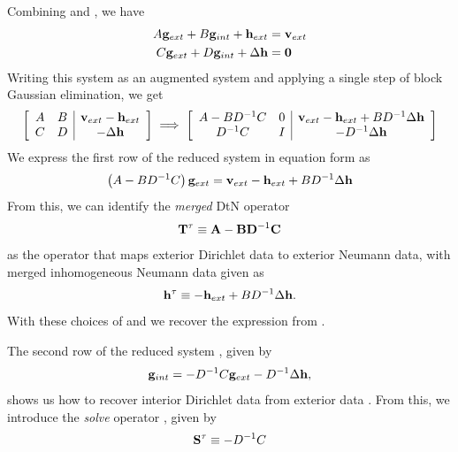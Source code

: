 Combining  and , we have
\begin{equation}
\begin{aligned}
A\mathbf g_{ext} + B\mathbf g_{int} + \mathbf h_{ext} & = \mathbf v_{ext} \\
C\mathbf g_{ext} + D\mathbf g_{int} + \Delta \mathbf h & = \mathbf 0
\end{aligned}
\end{equation}
Writing this system as an augmented system and applying a single step of block Gaussian elimination, we get
\begin{equation}
\left[
\begin{array}{cc|c}
A & B & \mathbf v_{ext} - \mathbf h_{ext}\\
C & D & -\Delta \mathbf h\\
\end{array}\right]
\;
\Longrightarrow 
\;
\left[
\begin{array}{cc|c}
A - BD^{-1}C & 0 & \mathbf v_{ext} - \mathbf h_{ext} + B D^{-1}\Delta \mathbf h\\
D^{-1}C      & I & -D^{-1}\Delta \mathbf h
\end{array}\right]
\label{eq:reduced_system}
\end{equation}
We express the first row of the reduced system in equation form as 
\begin{equation}
\left(A - BD^{-1}C\right) \mathbf g_{ext} = \mathbf v_{ext} - \mathbf h_{ext} + B D^{-1}\Delta \mathbf h
\label{eq:complete_ops}
\end{equation}
From this, we can identify the {\em merged} DtN operator 
\begin{equation}
\mathbf T^{\tau} \equiv \mathbf{A} - \mathbf{B} \mathbf{D}^{-1} \mathbf{C} 
\label{eq:Ttau-merged}
\end{equation}
as the operator that maps exterior Dirichlet data to exterior Neumann data, with merged inhomogeneous Neumann data given as
\begin{equation}
\mathbf h^{\tau} \equiv -\mathbf h_{ext} + B D^{-1}\Delta \mathbf h. 
\label{eq:htau-merged}
\end{equation}
With these choices of \Ttau and \htau  we recover the expression from .

The second row of the reduced system , given by 
\begin{equation}
\mathbf g_{int} = -D^{-1}C \mathbf g_{ext} -D^{-1} \Delta \mathbf h,
\end{equation}
shows us how to recover interior Dirichlet data \gint  from exterior data \gext.  
From this, we introduce the {\em solve} operator \Stau, given by 
\begin{equation}
\mathbf S^{\tau} \equiv -D^{-1}C
\label{eq:Stau-merged}
\end{equation}

